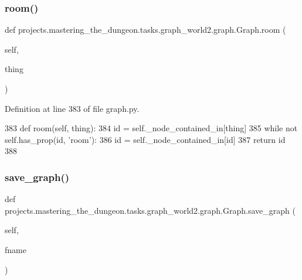\subsubsection{\texorpdfstring{room()}{room()}}
{\footnotesize\ttfamily def projects.\+mastering\+\_\+the\+\_\+dungeon.\+tasks.\+graph\+\_\+world2.\+graph.\+Graph.\+room (\begin{DoxyParamCaption}\item[{}]{self,  }\item[{}]{thing }\end{DoxyParamCaption})}



Definition at line 383 of file graph.\+py.


\begin{DoxyCode}
383     \textcolor{keyword}{def }room(self, thing):
384         id = self.\_node\_contained\_in[thing]
385         \textcolor{keywordflow}{while} \textcolor{keywordflow}{not} self.has\_prop(id, \textcolor{stringliteral}{'room'}):
386             id = self.\_node\_contained\_in[id]
387         \textcolor{keywordflow}{return} id
388 
\end{DoxyCode}
\mbox{\label{classprojects_1_1mastering__the__dungeon_1_1tasks_1_1graph__world2_1_1graph_1_1Graph_a605d2a67ebf1d4336f15a0d2a0bf230c}} 
\subsubsection{\texorpdfstring{save\+\_\+graph()}{save\_graph()}}
{\footnotesize\ttfamily def projects.\+mastering\+\_\+the\+\_\+dungeon.\+tasks.\+graph\+\_\+world2.\+graph.\+Graph.\+save\+\_\+graph (\begin{DoxyParamCaption}\item[{}]{self,  }\item[{}]{fname }\end{DoxyParamCaption})}




